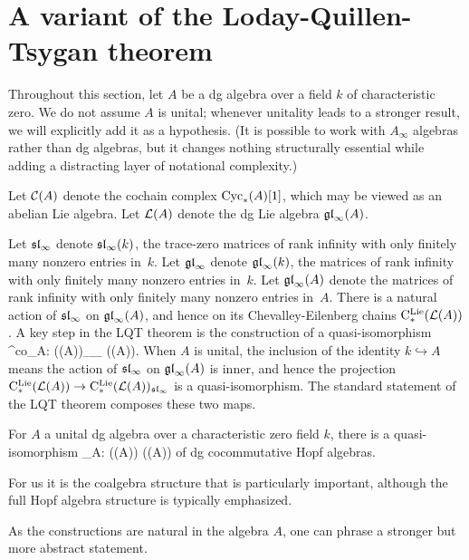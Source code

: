 \documentclass[11pt]{amsart}
\numberwithin{equation}{section}
\begin{document}
\section{A variant of the Loday-Quillen-Tsygan theorem}

Throughout this section, let $A$ be a dg algebra over a field $k$ of characteristic zero.
We do not assume $A$ is unital; whenever unitality leads to a stronger result, we will explicitly add it as a hypothesis.
(It is possible to work with $A_\infty$ algebras rather than dg algebras, 
but it changes nothing structurally essential while adding a distracting layer of notational complexity.)

\begin{dfn}
Let $\cC(A)$ denote the cochain complex $\Cyc_*(A)[1]$, which may be viewed as an abelian Lie algebra. 
Let $\cL(A)$ denote the dg Lie algebra $\gl_\infty(A)$.
\end{dfn}

Let $\sl_\infty$ denote $\sl_\infty(k)$, the trace-zero matrices of rank infinity with only finitely many nonzero entries in~$k$.
Let $\gl_\infty$ denote $\gl_\infty(k)$, the matrices of rank infinity with only finitely many nonzero entries in~$k$.
Let $\gl_\infty(A)$ denote the matrices of rank infinity with only finitely many nonzero entries in~$A$.
There is a natural action of $\sl_\infty$ on $\gl_\infty(A)$, 
and hence on its Chevalley-Eilenberg chains $\cliels(\cL(A))$.
A key step in the LQT theorem is the construction of a quasi-isomorphism
\beqn\label{lqtco}
\lambda^{co}_A: \cliels(\cL(A))_{\sl_\infty} \xto{\cong} \Sym(\cC(A)).
\eeqn
When $A$ is unital, the inclusion of the identity $k \hookrightarrow A$ means the action of $\sl_\infty$ on $\gl_\infty(A)$ is inner, 
and hence the projection $\cliels(\cL(A)) \to \cliels(\cL(A))_{\sl_\infty}$ is a quasi-isomorphism.
The standard statement of the LQT theorem composes these two maps.

\begin{thm}
For $A$ a unital dg algebra over a characteristic zero field $k$,
there is a quasi-isomorphism
\beqn\label{lqt}
\lambda_A: \cliels(\cL(A)) \xto{\simeq} \Sym(\cC(A))
\eeqn
of dg cocommutative Hopf algebras.
\end{thm}

For us it is the coalgebra structure that is particularly important, although the full Hopf algebra structure is typically emphasized.

As the constructions are natural in the algebra $A$, one can phrase a stronger but more abstract statement.
\end{document}
